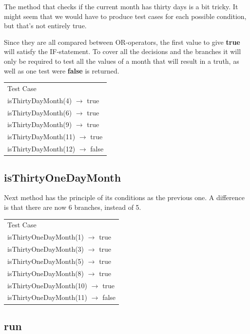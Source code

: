 \documentclass[a4paper]{article}
\begin{document}
The method that checks if the current month has thirty days is a bit tricky. It might seem that we would have to produce test cases for each possible condition, but that's not entirely true. 

Since they are all compared between OR-operators, the first value to give \textbf{true} will satisfy the IF-statement. To cover all the decisions and the branches it will only be required to test all the values of a month that will result in a truth, as well as one test were \textbf{false} is returned.

\begin{table}[h]
	\begin{tabular}{l}
		Test Case\\
		isThirtyDayMonth(4) $\rightarrow$ true\\
		isThirtyDayMonth(6) $\rightarrow$ true\\
		isThirtyDayMonth(9) $\rightarrow$ true\\
		isThirtyDayMonth(11) $\rightarrow$ true\\		
		isThirtyDayMonth(12) $\rightarrow$ false\\
	\end{tabular}
\end{table}

\subsection*{isThirtyOneDayMonth}

Next method has the principle of its conditions as the previous one. A difference is that there are now 6 branches, instead of 5.

\begin{table}[h]
	\begin{tabular}{l}
		Test Case\\
		isThirtyOneDayMonth(1) $\rightarrow$ true\\
		isThirtyOneDayMonth(3) $\rightarrow$ true\\
		isThirtyOneDayMonth(5) $\rightarrow$ true\\
		isThirtyOneDayMonth(8) $\rightarrow$ true\\		
		isThirtyOneDayMonth(10) $\rightarrow$ true\\
		isThirtyOneDayMonth(11) $\rightarrow$ false\\
	\end{tabular}
\end{table}

\subsection*{run}
\end{document}
